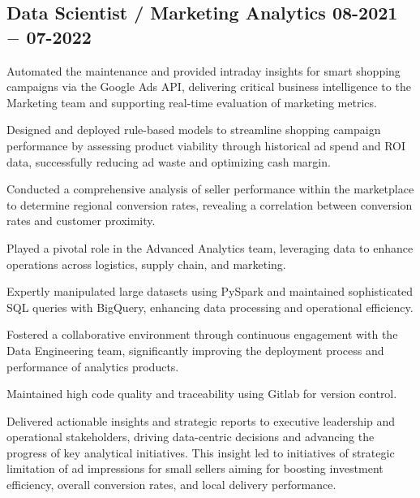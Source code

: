 \subsection{{Data Scientist / Marketing Analytics \hfill 08-2021 $-$ 07-2022}}
\begin{zitemize}
\item Automated the maintenance and provided intraday insights for smart shopping campaigns via the Google Ads API, delivering critical business intelligence to the Marketing team and supporting real-time evaluation of marketing metrics.
\item Designed and deployed rule-based models to streamline shopping campaign performance by assessing product viability through historical ad spend and ROI data, successfully reducing ad waste and optimizing cash margin.
\item Conducted a comprehensive analysis of seller performance within the marketplace to determine regional conversion rates, revealing a correlation between conversion rates and customer proximity. 
\item Played a pivotal role in the Advanced Analytics team, leveraging data to enhance operations across logistics, supply chain, and marketing. 
\item Expertly manipulated large datasets using PySpark and maintained sophisticated SQL queries with BigQuery, enhancing data processing and operational efficiency.
\item Fostered a collaborative environment through continuous engagement with the Data Engineering team, significantly improving the deployment process and performance of analytics products. 
\item Maintained high code quality and traceability using Gitlab for version control.
\item Delivered actionable insights and strategic reports to executive leadership and operational stakeholders, driving data-centric decisions and advancing the progress of key analytical initiatives. This insight led to initiatives of strategic limitation of ad impressions for small sellers aiming for boosting investment efficiency, overall conversion rates, and local delivery performance.
\end{zitemize}


